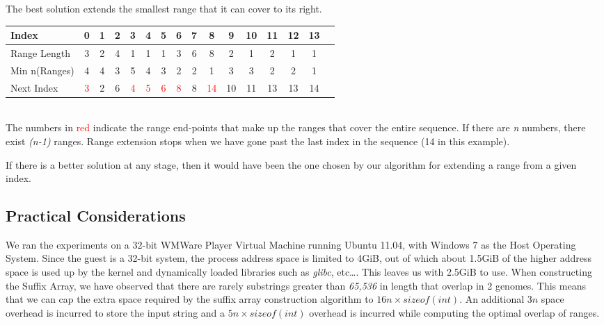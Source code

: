 \documentclass[11pt]{article}
\begin{document}
The best solution extends the smallest range that it can cover to its
right.

\begin{center}
  \begin{tabular}{|l|c|c|c|c|c|c|c|c|c|c|c|c|c|c|c|}
    \hline
    Index         & 0 & 1 & 2 & 3 & 4 & 5 & 6 & 7 & 8 & 9 &10 &11 &12 &13\\
    \hline
    Range Length  & 3 & 2 & 4 & 1 & 1 & 1 & 3 & 6 & 8 & 2 & 1 & 2 & 1 & 1\\
    \hline
    Min n(Ranges) & 4 & 4 & 3 & 5 & 4 & 3 & 2 & 2 & 1 & 3 & 3 & 2 & 2 & 1\\
    \hline
    Next Index    & \textcolor{red}{3} & 2 & 6 & \textcolor{red}{4} & \textcolor{red}{5} & \textcolor{red}{6} & \textcolor{red}{8} & 8 & \textcolor{red}{14} &10 &11 &13 &13 &14\\
    \hline
  \end{tabular}\\
  \vspace{0.3cm}
  The numbers in \textcolor{red}{red} indicate the range end-points
  that make up the ranges that cover the entire sequence. If there are
  \textit{n} numbers, there exist \textit{(n-1)} ranges. Range
  extension stops when we have gone past the last index in the
  sequence (14 in this example).
\end{center}

If there is a better solution at any stage, then it would have been
the one chosen by our algorithm for extending a range from a given
index.

\subsection{Practical Considerations}

We ran the experiments on a 32-bit WMWare Player Virtual Machine
running Ubuntu 11.04, with Windows 7 as the Host Operating
System. Since the guest is a 32-bit system, the process address space
is limited to 4GiB, out of which about 1.5GiB of the higher address
space is used up by the kernel and dynamically loaded libraries such
as \textit{glibc}, etc\ldots{}. This leaves us with 2.5GiB to
use. When constructing the Suffix Array, we have observed that there
are rarely substrings greater than \textit{65,536} in length that
overlap in 2 genomes. This means that we can cap the extra space
required by the suffix array construction algorithm to $16n \times
sizeof(int)$. An additional $3n$ space overhead is incurred to store
the input string and a $5n \times sizeof(int)$ overhead is incurred
while computing the optimal overlap of ranges.
\end{document}
